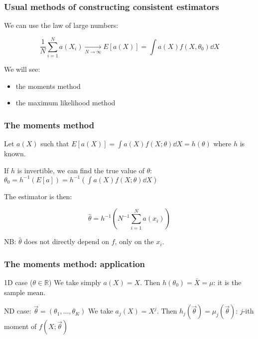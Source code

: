 \documentclass[9pt]{beamer}
\begin{document}
\begin{frame}
 \frametitle{Usual methods of constructing consistent estimators}
 
 We can use the law of large numbers:
 
 $$\frac{1}{N} \sum_{i=1}^N a(X_i) \xrightarrow[N\to\infty]{} E[a(X)] = \int a(X)f(X,\theta_0)\dd X$$
 
 We will see:
 
 \begin{itemize}
  \item the moments method
  \item the maximum likelihood method
 \end{itemize}

 
\end{frame}

\begin{frame}
 \frametitle{The moments method}
 
 Let $a(X)$ such that $E[a(X)] = \int a(X) f(X;\theta) \dd X = h(\theta)$ where $h$ is known. 
 
 If $h$ is invertible, we can find the true value of $\theta$: 
 $\theta_0 = h^{-1}(E[a]) = h^{-1}\left(\int a(X) f(X;\theta) \dd X\right)$
 
 The estimator is then:
 
 $$\hat{\theta} = h^{-1} \left( N^{-1} \sum_{i=1}^N a(x_i) \right)$$
 
 NB: $\hat{\theta}$ does not directly depend on $f$, only on the $x_i$.
\end{frame}

\begin{frame}
 \frametitle{The moments method: application}
 
 \begin{block}{1D case ($\theta \in \mathbb{R}$)}
  We take simply $a(X) = X$. Then $h(\theta_0) = \bar{X} = \mu$: it is the sample mean.
 \end{block}
 
 \begin{block}{ND case: $\vec{\theta} = (\theta_1,\dots,\theta_K)$}
  We take $a_j(X) = X^j$. Then $h_j(\vec{\theta}) = \mu_j(\vec{\theta})$: $j$-ith moment of $f(X;\vec{\theta})$
 \end{block}


\end{frame}
\end{document}

